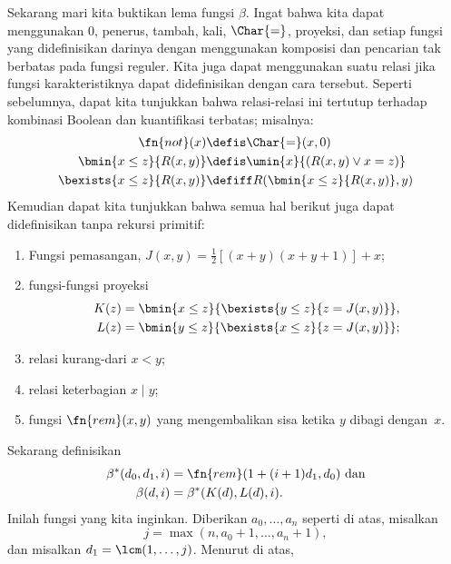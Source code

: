 \documentclass[../../../include/open-logic-section]{subfiles}
\begin{document}
Sekarang mari kita buktikan lema fungsi $\beta$. Ingat bahwa kita dapat
menggunakan $0$, penerus, tambah, kali, $\Char{=}$, proyeksi, dan setiap
fungsi yang didefinisikan darinya dengan menggunakan komposisi dan
pencarian tak berbatas pada fungsi reguler. Kita juga dapat menggunakan
suatu relasi jika fungsi karakteristiknya dapat didefinisikan dengan cara
tersebut. Seperti sebelumnya, dapat kita tunjukkan bahwa relasi-relasi ini
tertutup terhadap kombinasi Boolean dan kuantifikasi terbatas; misalnya:
\begin{align*}
\fn{not}(x) & \defis \Char{=}(x,0)\\
\bmin{x \leq z}{R(x,y)} & \defis \umin{x}{(R(x,y) \lor x = z)}\\
\bexists{x \leq z}{R(x,y)} & \defiff R(\bmin{x \leq z}{R(x,y)}, y)
\end{align*}
Kemudian dapat kita tunjukkan bahwa semua hal berikut juga dapat didefinisikan
tanpa rekursi primitif:
\begin{enumerate}
\item Fungsi pemasangan, $J(x,y) = \frac{1}{2}[(x+y)(x+y+1)] + x$;
\item fungsi-fungsi proyeksi
\begin{align*}
K(z) & = \bmin{x \leq z}{\bexists{y \leq z}{z = J(x,y)}},\\
L(z) & = \bmin{y \leq z}{\bexists{x \leq z}{z = J(x,y)}};
\end{align*}
\item relasi kurang-dari $x < y$;
\item relasi keterbagian $x \mid y$;
\item fungsi $\fn{rem}(x,y)$ yang mengembalikan sisa ketika $y$ dibagi
  dengan~$x$.
\end{enumerate}
Sekarang definisikan
\begin{align*}
\beta^*(d_0,d_1,i) & = \fn{rem}(1+(i+1) d_1,d_0) \text{ dan}\\
\beta(d,i) & = \beta^*(K(d),L(d),i).
\end{align*}
Inilah fungsi yang kita inginkan. Diberikan $a_0,\dots,a_n$ seperti di atas,
misalkan
\[
j = \max(n,a_0+1,\dots,a_n+1),
\]
dan misalkan $d_1 = \lcm(1,\dots,j)$. Menurut  di atas,
\end{document}

